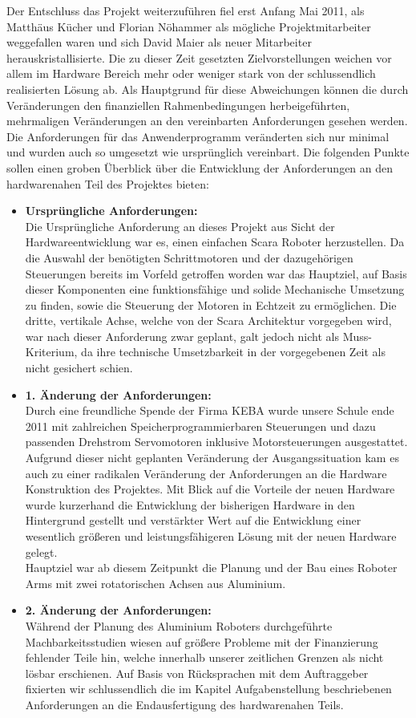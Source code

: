 Der Entschluss das Projekt weiterzuführen fiel erst Anfang Mai 2011, als Matthäus Kücher und Florian Nöhammer als mögliche Projektmitarbeiter weggefallen waren und sich David Maier als neuer Mitarbeiter herauskristallisierte. 
Die zu dieser Zeit gesetzten Zielvorstellungen weichen vor allem im Hardware Bereich mehr oder weniger stark von der schlussendlich realisierten Lösung ab. Als Hauptgrund für diese Abweichungen können die durch Veränderungen den finanziellen Rahmenbedingungen herbeigeführten, mehrmaligen Veränderungen an den vereinbarten Anforderungen gesehen werden. Die Anforderungen für das Anwenderprogramm veränderten sich nur minimal und wurden auch so umgesetzt wie ursprünglich vereinbart.
Die folgenden Punkte sollen einen groben Überblick über die Entwicklung der Anforderungen an den hardwarenahen Teil des Projektes bieten:\\
\begin{itemize}
\item \textbf{Ursprüngliche Anforderungen:}\\
Die Ursprüngliche Anforderung an dieses Projekt aus Sicht der Hardwareentwicklung war es, einen einfachen Scara Roboter herzustellen. Da die Auswahl der benötigten Schrittmotoren und der dazugehörigen Steuerungen bereits im Vorfeld getroffen worden war das Hauptziel, auf Basis dieser Komponenten eine funktionsfähige und solide Mechanische Umsetzung zu finden, sowie die Steuerung der Motoren in Echtzeit zu ermöglichen.
Die dritte, vertikale Achse, welche von der Scara Architektur vorgegeben wird, war nach dieser Anforderung zwar geplant, galt jedoch nicht als Muss-Kriterium, da ihre technische Umsetzbarkeit in der vorgegebenen Zeit als nicht gesichert schien.
\item \textbf{1. Änderung der Anforderungen:}\\
Durch eine freundliche Spende der Firma KEBA wurde unsere Schule ende 2011 mit zahlreichen Speicherprogrammierbaren Steuerungen und dazu passenden Drehstrom Servomotoren inklusive Motorsteuerungen ausgestattet. Aufgrund dieser nicht geplanten Veränderung der Ausgangssituation kam es auch zu einer radikalen Veränderung der Anforderungen an die Hardware Konstruktion des Projektes. 
Mit Blick auf die Vorteile der neuen Hardware wurde kurzerhand die Entwicklung der bisherigen Hardware in den Hintergrund gestellt und verstärkter Wert auf die Entwicklung einer wesentlich größeren und leistungsfähigeren Lösung mit der neuen Hardware gelegt.\\
Hauptziel war ab diesem Zeitpunkt die Planung und der Bau eines Roboter Arms mit zwei rotatorischen Achsen aus Aluminium.

\item \textbf{2. Änderung der Anforderungen:}\\
Während der Planung des Aluminium Roboters durchgeführte Machbarkeitsstudien wiesen auf größere Probleme mit der Finanzierung fehlender Teile hin, welche innerhalb unserer zeitlichen Grenzen als nicht lösbar erschienen. Auf Basis von Rücksprachen mit dem Auftraggeber fixierten wir schlussendlich die im Kapitel Aufgabenstellung beschriebenen Anforderungen an die Endausfertigung des hardwarenahen Teils.
\end{itemize}
